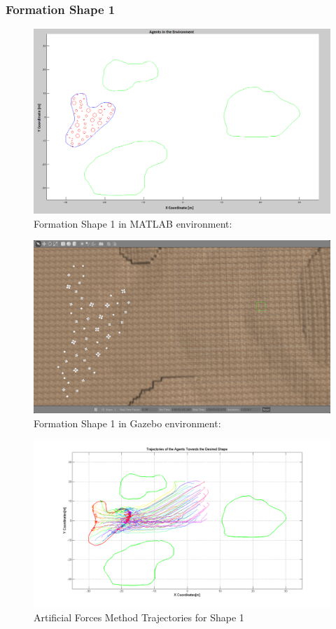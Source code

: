 \documentclass[twoside]{article}
\begin{document}
   \subsubsection{Formation Shape 1}
		
			\begin{figure}[H]
				\caption{Formation Shape 1 in MATLAB environment:}
				\centerline{\includegraphics[scale = 0.40]{Trajectories_Formation_Shape_1_2}}
			\end{figure} 	
			
				\begin{figure}[H]
					\caption{Formation Shape 1 in Gazebo environment:}
					\centerline{\includegraphics[scale = 0.35]{Trajectories_Formation_Shape_1_1}}
				\end{figure} 	
		
			\begin{figure}[H]
				\caption{Artificial Forces Method Trajectories for Shape 1}
				\centerline{\includegraphics[scale = 0.35]{Aritificial_Trajecories_1}}
			\end{figure} 	
\end{document}
